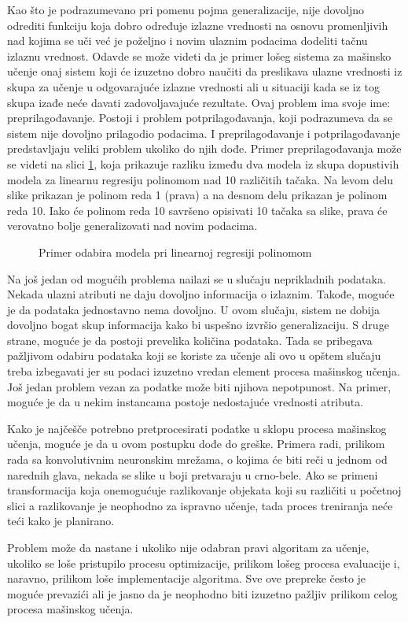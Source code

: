 Kao što je podrazumevano pri pomenu pojma generalizacije, nije dovoljno odrediti funkciju koja dobro određuje izlazne vrednosti na osnovu promenljivih nad kojima se uči već je poželjno i novim ulaznim podacima dodeliti tačnu izlaznu vrednost. Odavde se može videti da je primer lošeg sistema za mašinsko učenje onaj sistem koji će izuzetno dobro naučiti da preslikava ulazne vrednosti iz skupa za učenje u odgovarajuće izlazne vrednosti ali u situaciji kada se iz tog skupa izađe neće davati zadovoljavajuće rezultate. Ovaj problem ima svoje ime: preprilagođavanje. Postoji i problem potprilagođavanja, koji podrazumeva da se sistem nije dovoljno prilagodio podacima. I preprilagođavanje i potprilagođavanje predstavljaju veliki problem ukoliko do njih dođe. Primer preprilagođavanja može se videti na slici \ref{fig:odabir}, koja prikazuje razliku između dva modela iz skupa dopustivih modela za linearnu regresiju polinomom nad 10 različitih tačaka. Na levom delu slike prikazan je polinom reda 1 (prava) a na desnom delu prikazan je polinom reda 10. Iako će polinom reda 10 savršeno opisivati 10 tačaka sa slike, prava će verovatno bolje generalizovati nad novim podacima.
\begin{figure}
	\centering
	\resizebox{.45\linewidth}{!}{}
	\resizebox{.45\linewidth}{!}{}
	\caption{Primer odabira modela pri linearnoj regresiji polinomom}
	\label{fig:odabir}
\end{figure}

\par
Na još jedan od mogućih problema nailazi se u slučaju neprikladnih podataka. Nekada ulazni atributi ne daju dovoljno informacija o izlaznim. Takođe, moguće je da podataka jednostavno nema dovoljno. U ovom slučaju, sistem ne dobija dovoljno bogat skup informacija kako bi uspešno izvršio generalizaciju. S druge strane, moguće je da postoji prevelika količina podataka. Tada se pribegava pažljivom odabiru podataka koji se koriste za učenje ali ovo u opštem slučaju  treba izbegavati jer su podaci izuzetno vredan element procesa mašinskog učenja. Još jedan problem vezan za podatke može biti njihova nepotpunost. Na primer, moguće je da u nekim instancama postoje nedostajuće vrednosti atributa. \par
Kako je najčešče potrebno pretprocesirati podatke u sklopu procesa mašinskog učenja, moguće je da u ovom postupku dođe do greške. Primera radi, prilikom rada sa konvolutivnim neuronskim mrežama, o kojima će biti reči u jednom od narednih glava, nekada se slike  u boji pretvaraju u crno-bele. Ako se primeni transformacija koja onemogućuje razlikovanje objekata koji su različiti u početnoj slici a razlikovanje je neophodno za ispravno učenje, tada proces treniranja neće teći kako je planirano. \par


Problem može da nastane i ukoliko nije odabran pravi algoritam za učenje, ukoliko se loše pristupilo procesu optimizacije, prilikom lošeg procesa evaluacije i, naravno, prilikom loše implementacije algoritma. Sve ove prepreke često je moguće prevazići ali je jasno da je neophodno biti izuzetno pažljiv prilikom celog procesa mašinskog učenja.